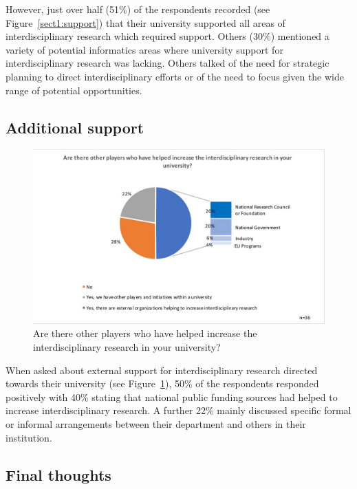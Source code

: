 However, just over half (51\%) of the respondents recorded (see Figure~\ref{sect1:support}) that their university supported all areas of interdisciplinary research which required  support. Others (30\%) mentioned a variety of potential informatics areas where university support for interdisciplinary research was lacking. Others talked of the need for strategic planning to direct interdisciplinary efforts or of the need to focus given the wide range of potential opportunities.

\subsection {Additional support}

\begin{figure}[h]
\centering
\includegraphics[width = \linewidth]{charts/1d.jpg}
\caption
{Are there other players who have helped increase the
interdisciplinary research in your university?}
\label{sect1:additional}
\end{figure}

When asked about external support for interdisciplinary research directed towards their university (see Figure~\ref{sect1:additional}), 50\% of the respondents responded positively with 40\% stating that national public funding sources had helped to increase interdisciplinary research. A further 22\% mainly discussed specific formal or informal arrangements between their department and others in their institution.

\subsection{Final thoughts}

